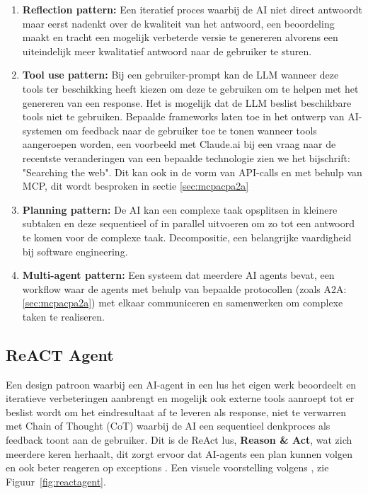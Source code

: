 \begin{enumerate}
    \item \textbf{Reflection pattern:} Een iteratief proces waarbij de AI niet direct antwoordt maar eerst nadenkt over de kwaliteit van het antwoord, een beoordeling maakt en tracht een mogelijk verbeterde versie te genereren alvorens een uiteindelijk meer kwalitatief antwoord naar de gebruiker te sturen.
    \item \textbf{Tool use pattern:} Bij een gebruiker-prompt kan de LLM wanneer deze tools ter beschikking heeft kiezen om deze te gebruiken om te helpen met het genereren van een response. Het is mogelijk dat de LLM beslist beschikbare tools niet te gebruiken. Bepaalde frameworks laten toe in het ontwerp van AI-systemen om feedback naar de gebruiker toe te tonen wanneer tools aangeroepen worden, een voorbeeld met Claude.ai bij een vraag naar de recentste veranderingen van een bepaalde technologie zien we het bijschrift: "Searching the web". Dit kan ook in de vorm van API-calls en met behulp van MCP, dit wordt besproken in sectie \ref{sec:mcpacpa2a}
    \item \textbf{Planning pattern:} De AI kan een complexe taak opsplitsen in kleinere subtaken en deze sequentieel of in parallel uitvoeren om zo tot een antwoord te komen voor de complexe taak. Decompositie, een belangrijke vaardigheid bij software engineering.
    \item \textbf{Multi-agent pattern:} Een systeem dat meerdere AI agents bevat, een workflow waar de agents met behulp van bepaalde protocollen (zoals A2A: \ref{sec:mcpacpa2a}) met elkaar communiceren en samenwerken om complexe taken te realiseren.
\end{enumerate}

\subsection{ReACT Agent}
\label{ssec:reactagent}


Een design patroon waarbij een AI-agent in een lus het eigen werk beoordeelt en iteratieve verbeteringen aanbrengt en mogelijk ook externe tools aanroept tot er beslist wordt om het eindresultaat af te leveren als response, niet te verwarren met Chain of Thought (CoT) waarbij de AI een sequentieel denkproces als feedback toont aan de gebruiker. Dit is de ReAct lus, \textbf{Reason \& Act}, wat zich meerdere keren herhaalt, dit zorgt ervoor dat AI-agents een plan kunnen volgen en ook beter reageren op exceptions \autocite{yao2023}. Een visuele voorstelling volgens \autocite{HuggingFacea}, zie Figuur~\ref{fig:reactagent}.


